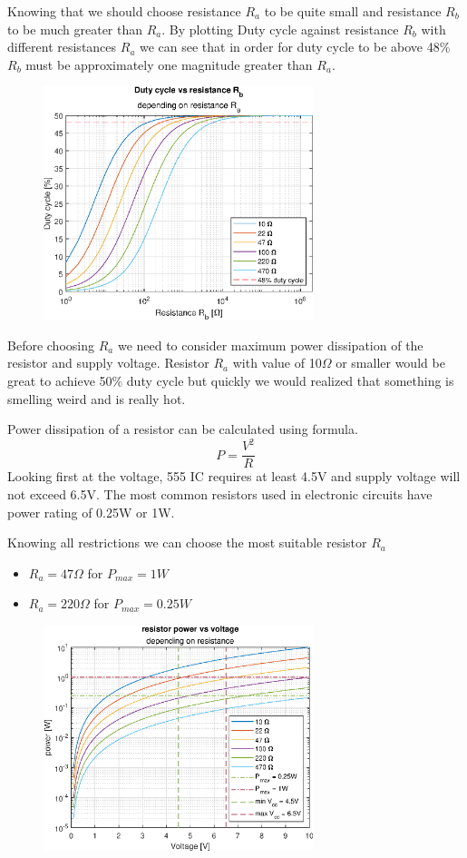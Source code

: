 \documentclass[english,10pt,a4paper]{article}
\begin{document}
	Knowing that we should choose resistance $R_a$ to be quite small and resistance $R_b$ to be much greater than $R_a$. 
	By plotting Duty cycle against resistance $R_b$ with different resistances $R_a$ we can see that in order for duty cycle to be above 48\% $R_b$ must be approximately one magnitude greater than $R_a$.
	
	\begin{figure}[H]
		\centering
		\includegraphics[width=0.7\textwidth]{img/dc_plot.eps}
	\end{figure}
	
	Before choosing $R_a$ we need to consider maximum power dissipation of the resistor and supply voltage. Resistor $R_a$ with value of 10$\Omega$ or smaller would be great to achieve 50\% duty cycle but quickly we would realized that something is smelling weird and is really hot.
	
	Power dissipation of a resistor can be calculated using formula.
	\begin{equation}
		P = \frac{V^2}{R}
	\end{equation}
	Looking first at the voltage, 555 IC requires at least 4.5V and supply voltage will not exceed 6.5V. The most common resistors used in electronic circuits have power rating of 0.25W or 1W.
	
	Knowing all restrictions we can choose the most suitable resistor $R_a$
	\begin{itemize}
		\item $R_a = 47\Omega$ for $P_{max} = 1W$
		\item $R_a = 220\Omega$ for $P_{max} = 0.25W$
	\end{itemize}
	\begin{figure}[H]
		\centering
		\includegraphics[width=0.7\textwidth]{img/pr_plot.eps}
	\end{figure}
\end{document}

